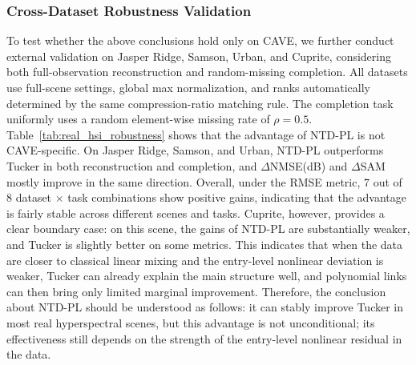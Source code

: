 \subsubsection{Cross-Dataset Robustness Validation}

To test whether the above conclusions hold only on CAVE, we further conduct external validation on Jasper Ridge, Samson, Urban, and Cuprite, considering both full-observation reconstruction and random-missing completion. All datasets use full-scene settings, global max normalization, and ranks automatically determined by the same compression-ratio matching rule. The completion task uniformly uses a random element-wise missing rate of $\rho=0.5$. Table~\ref{tab:real_hsi_robustness} shows that the advantage of NTD-PL is not CAVE-specific. On Jasper Ridge, Samson, and Urban, NTD-PL outperforms Tucker in both reconstruction and completion, and $\Delta$NMSE(dB) and $\Delta$SAM mostly improve in the same direction. Overall, under the RMSE metric, $7$ out of $8$ dataset $\times$ task combinations show positive gains, indicating that the advantage is fairly stable across different scenes and tasks. Cuprite, however, provides a clear boundary case: on this scene, the gains of NTD-PL are substantially weaker, and Tucker is slightly better on some metrics. This indicates that when the data are closer to classical linear mixing and the entry-level nonlinear deviation is weaker, Tucker can already explain the main structure well, and polynomial links can then bring only limited marginal improvement. Therefore, the conclusion about NTD-PL should be understood as follows: it can stably improve Tucker in most real hyperspectral scenes, but this advantage is not unconditional; its effectiveness still depends on the strength of the entry-level nonlinear residual in the data.

\begin{table}[htbp]
    \centering
    \caption{Main table for cross-dataset robustness validation. In the Recon. rows, Tucker / NTD-PL denotes RMSE; in the Compl. rows, Tucker / NTD-PL denotes RMSE$^\ast$. Gain(\%), $\Delta$NMSE(dB), and $\Delta$SAM are uniformly defined as Tucker $-$ NTD-PL, so positive values indicate that NTD-PL is better.}
    \label{tab:real_hsi_robustness}
    \small
    
\end{table}
